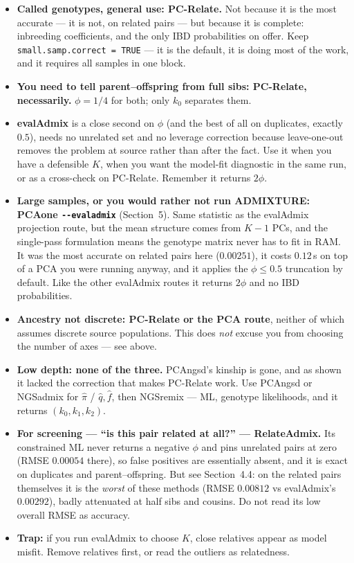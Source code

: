 \documentclass[10pt,a4paper]{article}
\newenvironment{tightitem}{%
  \begin{itemize}\setlength{\itemsep}{1pt}\setlength{\parskip}{0pt}%
  \setlength{\topsep}{3pt}\setlength{\parsep}{0pt}}{\end{itemize}}
\begin{document}
\begin{tightitem}
  \item \textbf{Called genotypes, general use: PC-Relate.} Not because it is the most accurate --- it is
  not, on related pairs --- but because it is complete: inbreeding
  coefficients, and the only IBD probabilities on offer. Keep \texttt{small.samp.correct = TRUE} --- it is
  the default, it is doing most of the work, and it requires all samples in one block.
  \item \textbf{You need to tell parent--offspring from full sibs: PC-Relate, necessarily.} $\phi=1/4$ for
  both; only $k_0$ separates them.
  \item \textbf{evalAdmix} is a close second on $\phi$ (and the best of all on duplicates, exactly $0.5$),
  needs no unrelated set and no leverage correction because leave-one-out removes the problem at source
  rather than after the fact. Use it when you have a defensible $K$, when you want the model-fit diagnostic
  in the same run, or as a cross-check on PC-Relate. Remember it returns $2\phi$.
  \item \textbf{Large samples, or you would rather not run ADMIXTURE: PCAone
  \texttt{-{}-evaladmix}} (Section~5). Same statistic as the evalAdmix projection route, but the mean
  structure comes from $K-1$ PCs, and the single-pass formulation means the genotype matrix never has to fit
  in RAM. It was the most accurate on related pairs here ($0.00251$), it costs $0.12$\,s on top of a PCA you
  were running anyway, and it applies the $\phi\le0.5$ truncation by default. Like the other evalAdmix
  routes it returns $2\phi$ and no IBD probabilities.
  \item \textbf{Ancestry not discrete: PC-Relate or the PCA route}, neither of which assumes discrete
  source populations. This does \emph{not} excuse you from choosing the number of axes --- see above.
  \item \textbf{Low depth: none of the three.} PCAngsd's kinship is gone, and as shown it lacked the
  correction that makes PC-Relate work. Use PCAngsd or NGSadmix for $\hat\pi$ / $\hat q,\hat f$, then
  NGSremix --- ML, genotype likelihoods, and it returns $(k_0,k_1,k_2)$.
  \item \textbf{For screening --- ``is this pair related at all?'' --- RelateAdmix.} Its constrained ML
  never returns a negative $\phi$ and pins unrelated pairs at zero (RMSE $0.00054$ there), so false positives
  are essentially absent, and it is exact on duplicates and parent--offspring. But see Section~4.4: on the
  related pairs themselves it is the \emph{worst} of these methods (RMSE $0.00812$ vs evalAdmix's
  $0.00292$), badly attenuated at half sibs and cousins. Do not read its low overall RMSE as accuracy.
  \item \textbf{Trap:} if you run evalAdmix to choose $K$, close relatives appear as model misfit. Remove
  relatives first, or read the outliers as relatedness.
\end{tightitem}
\end{document}
